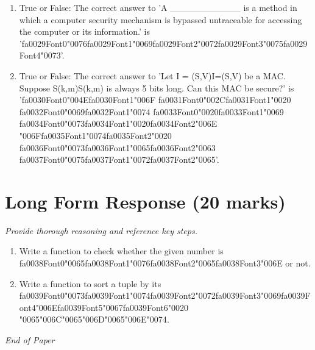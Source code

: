 \documentclass[12pt]{article}
\begin{document}
\begin{enumerate}[label=\arabic*.]
\item True or False: The correct answer to 'A \_\_\_\_\_\_\_\_\_\_\_ is a method in which a computer security mechanism is bypassed untraceable for accessing the computer or its information.' is '{\csname fa0029Font0\endcsname\char"0076}{\csname fa0029Font1\endcsname\char"0069}{\csname fa0029Font2\endcsname\char"0072}{\csname fa0029Font3\endcsname\char"0075}{\csname fa0029Font4\endcsname\char"0073}'.
\item True or False: The correct answer to 'Let I = (S,V)I=(S,V) be a MAC. Suppose S(k,m)S(k,m) is always 5 bits long. Can this MAC be secure?' is '{\csname fa0030Font0\endcsname\char"004E}{\csname fa0030Font1\endcsname\char"006F} {\csname fa0031Font0\endcsname\char"002C}{\csname fa0031Font1\endcsname\char"0020} {\csname fa0032Font0\endcsname\char"0069}{\csname fa0032Font1\endcsname\char"0074} {\csname fa0033Font0\endcsname\char"0020}{\csname fa0033Font1\endcsname\char"0069} {\csname fa0034Font0\endcsname\char"0073}{\csname fa0034Font1\endcsname\char"0020}{\csname fa0034Font2\endcsname\char"006E} {\char"006F}{\csname fa0035Font1\endcsname\char"0074}{\csname fa0035Font2\endcsname\char"0020} {\csname fa0036Font0\endcsname\char"0073}{\csname fa0036Font1\endcsname\char"0065}{\csname fa0036Font2\endcsname\char"0063} {\csname fa0037Font0\endcsname\char"0075}{\csname fa0037Font1\endcsname\char"0072}{\csname fa0037Font2\endcsname\char"0065}'.
\end{enumerate}

\section*{Long Form Response (20 marks)}
\textit{Provide thorough reasoning and reference key steps.}
\begin{enumerate}[label=\arabic*.]
\item Write a function to check whether the given number is {\csname fa0038Font0\endcsname\char"0065}{\csname fa0038Font1\endcsname\char"0076}{\csname fa0038Font2\endcsname\char"0065}{\csname fa0038Font3\endcsname\char"006E} or not.
\item Write a function to sort a tuple by its {\csname fa0039Font0\endcsname\char"0073}{\csname fa0039Font1\endcsname\char"0074}{\csname fa0039Font2\endcsname\char"0072}{\csname fa0039Font3\endcsname\char"0069}{\csname fa0039Font4\endcsname\char"006E}{\csname fa0039Font5\endcsname\char"0067}{\csname fa0039Font6\endcsname\char"0020} {\char"0065}{\char"006C}{\char"0065}{\char"006D}{\char"0065}{\char"006E}{\char"0074}.
\end{enumerate}

\vfill
\noindent\textit{End of Paper}
\end{document}
